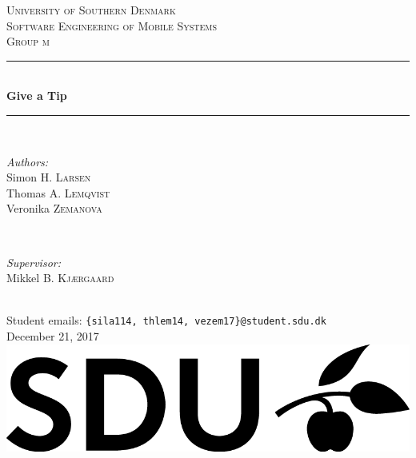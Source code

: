 \documentclass[12pt]{article}
\newcommand{\changeNumbering}[1]{
	\fancypagestyle{plain}{
		\renewcommand\headrulewidth{0pt}
		\fancyhf{}
		\fancyfoot[R]{\thepage\ of \pageref{#1}}
	}
	\fancyfoot[R]{\thepage\ of \pageref{#1}}
}
\begin{document}
\listoftodos

\begin{titlepage}

\newcommand{\HRule}{\rule{\linewidth}{0.5mm}} %

\center %
 

\textsc{\LARGE University of Southern Denmark}\\[1.5cm] %
\textsc{\Large Software Engineering of Mobile Systems}\\[0.5cm] %
\textsc{\large Group m}\\[0.5cm] %


\HRule \\[0.4cm]
{ \huge \bfseries Give a Tip}\\[0.4cm] 
\HRule \\[1.5cm]
 

\begin{minipage}[t]{0.4\textwidth}
\begin{flushleft} \large
\emph{Authors:}\\
Simon \textsc{H. Larsen}\\
Thomas \textsc{A. Lemqvist}\\
Veronika \textsc{Zemanova}\\
\end{flushleft}
\end{minipage}
~
\begin{minipage}[t]{0.4\textwidth}
\begin{flushright} \large
\emph{Supervisor:} \\
Mikkel \textsc{B. Kjærgaard}
\end{flushright}
\end{minipage}\\[2cm]
Student emails: \texttt{\{sila114, thlem14, vezem17\}@student.sdu.dk}\\[2em]
{\large December 21, 2017}\\[2cm] 

\includegraphics[width=.5\textwidth]{images/logo.png}\\[1cm]

\vfill 

\end{titlepage}
\changeNumbering{EndOfMainMatter}

\begin{abstract}

\end{abstract}

\vfill

\setcounter{tocdepth}{2}
\tableofcontents

\clearpage


\end{document}
